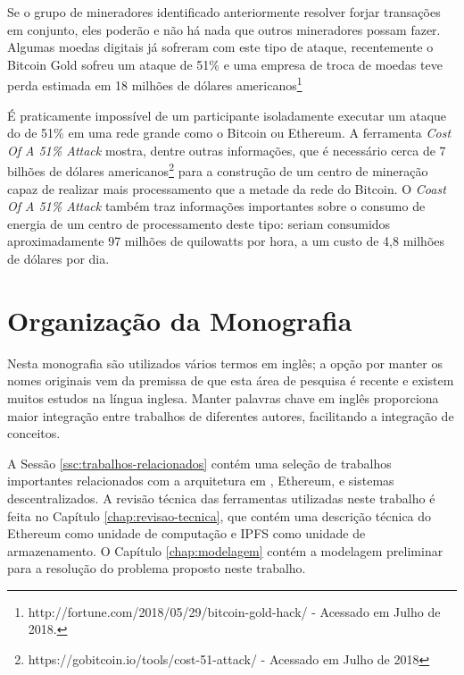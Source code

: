 \documentclass[tcc,capa]{texufpel}
\begin{document}
    Se o grupo de mineradores identificado anteriormente resolver forjar transações em conjunto, eles poderão e não há nada que outros mineradores possam fazer. Algumas moedas digitais já sofreram com este tipo de ataque, recentemente o Bitcoin Gold sofreu um ataque de 51\% e uma empresa de troca de moedas teve perda estimada em 18 milhões de dólares americanos\footnote{http://fortune.com/2018/05/29/bitcoin-gold-hack/ - Acessado em Julho de 2018.}
    
    É praticamente impossível de um participante isoladamente executar um ataque do de 51\% em uma rede grande como o Bitcoin ou Ethereum. A ferramenta \textit{Cost Of A 51\% Attack} mostra, dentre outras informações, que é necessário cerca de 7 bilhões de dólares americanos\footnote{https://gobitcoin.io/tools/cost-51-attack/ - Acessado em Julho de 2018} para a construção de um centro de mineração capaz de realizar mais processamento que a metade da rede do Bitcoin. O \textit{Coast Of A 51\% Attack} também traz informações importantes sobre o consumo de energia de um centro de processamento deste tipo: seriam consumidos aproximadamente 97 milhões de quilowatts por hora, a um custo de 4,8 milhões de dólares por dia.

\section{Organização da Monografia}\label{sc:organizao-da-monografia}
    
    Nesta monografia são utilizados vários termos em inglês; a opção por manter os nomes originais vem da premissa de que esta área de pesquisa é recente e existem muitos estudos na língua inglesa. Manter palavras chave em inglês proporciona maior integração entre trabalhos de diferentes autores, facilitando a integração de conceitos.
    
    A Sessão \ref{ssc:trabalhos-relacionados} contém uma seleção de trabalhos importantes relacionados com a arquitetura em \bchain, Ethereum,  e sistemas descentralizados. A revisão técnica das ferramentas utilizadas neste trabalho é feita no Capítulo \ref{chap:revisao-tecnica}, que contém uma descrição técnica do Ethereum como unidade de computação e IPFS como unidade de armazenamento. O Capítulo \ref{chap:modelagem} contém a modelagem preliminar para a resolução do problema proposto neste trabalho.
    
\end{document}
